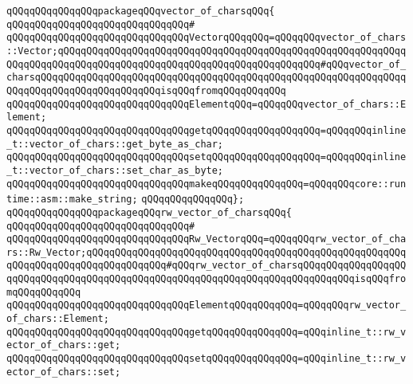 \verb|qQQqqQQqqQQqqQQqpackageqQQqvector_of_charsqQQq{|\newline
\verb|qQQqqQQqqQQqqQQqqQQqqQQqqQQqqQQq#|\newline
\verb|qQQqqQQqqQQqqQQqqQQqqQQqqQQqqQQqVectorqQQqqQQq=qQQqqQQqvector_of_chars::Vector;qQQqqQQqqQQqqQQqqQQqqQQqqQQqqQQqqQQqqQQqqQQqqQQqqQQqqQQqqQQqqQQqqQQqqQQqqQQqqQQqqQQqqQQqqQQqqQQqqQQqqQQqqQQqqQQqqQQq#qQQqvector_of_charsqQQqqQQqqQQqqQQqqQQqqQQqqQQqqQQqqQQqqQQqqQQqqQQqqQQqqQQqqQQqqQQqqQQqqQQqqQQqqQQqqQQqqQQqqQQqisqQQqfromqQQqqQQqqQQq|\newline
\verb|qQQqqQQqqQQqqQQqqQQqqQQqqQQqqQQqElementqQQq=qQQqqQQqvector_of_chars::Element;|\newline
\newline
\verb|qQQqqQQqqQQqqQQqqQQqqQQqqQQqqQQqgetqQQqqQQqqQQqqQQqqQQq=qQQqqQQqinline_t::vector_of_chars::get_byte_as_char;|\newline
\verb|qQQqqQQqqQQqqQQqqQQqqQQqqQQqqQQqsetqQQqqQQqqQQqqQQqqQQq=qQQqqQQqinline_t::vector_of_chars::set_char_as_byte;|\newline
\newline
\verb|qQQqqQQqqQQqqQQqqQQqqQQqqQQqqQQqmakeqQQqqQQqqQQqqQQq=qQQqqQQqcore::runtime::asm::make_string;|\newline
\verb|qQQqqQQqqQQqqQQq};|\newline
\newline
\verb|qQQqqQQqqQQqqQQqpackageqQQqrw_vector_of_charsqQQq{|\newline
\verb|qQQqqQQqqQQqqQQqqQQqqQQqqQQqqQQq#|\newline
\verb|qQQqqQQqqQQqqQQqqQQqqQQqqQQqqQQqRw_VectorqQQq=qQQqqQQqrw_vector_of_chars::Rw_Vector;qQQqqQQqqQQqqQQqqQQqqQQqqQQqqQQqqQQqqQQqqQQqqQQqqQQqqQQqqQQqqQQqqQQqqQQqqQQqqQQqqQQq#qQQqrw_vector_of_charsqQQqqQQqqQQqqQQqqQQqqQQqqQQqqQQqqQQqqQQqqQQqqQQqqQQqqQQqqQQqqQQqqQQqqQQqqQQqqQQqisqQQqfromqQQqqQQqqQQq|\newline
\verb|qQQqqQQqqQQqqQQqqQQqqQQqqQQqqQQqElementqQQqqQQqqQQq=qQQqqQQqrw_vector_of_chars::Element;|\newline
\newline
\verb|qQQqqQQqqQQqqQQqqQQqqQQqqQQqqQQqgetqQQqqQQqqQQqqQQq=qQQqinline_t::rw_vector_of_chars::get;|\newline
\verb|qQQqqQQqqQQqqQQqqQQqqQQqqQQqqQQqsetqQQqqQQqqQQqqQQq=qQQqinline_t::rw_vector_of_chars::set;|\newline
